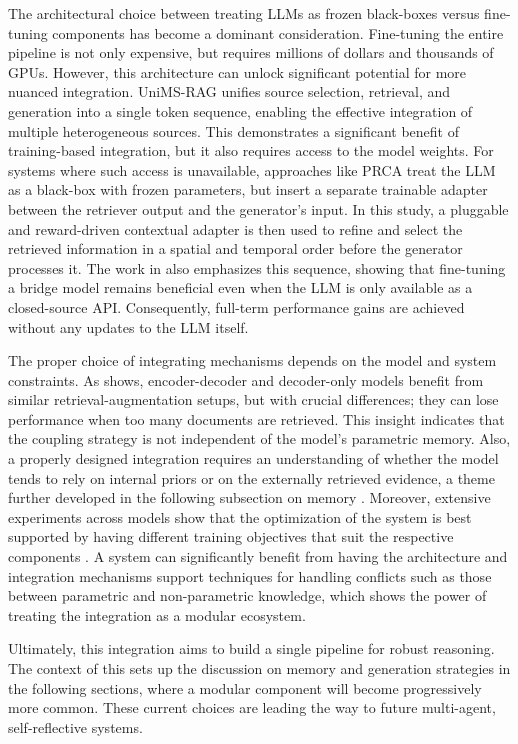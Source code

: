 \documentclass[11pt]{article}
\begin{document}
The architectural choice between treating LLMs as frozen black-boxes versus fine-tuning components has become a dominant consideration. Fine-tuning the entire pipeline is not only expensive, but requires millions of dollars and thousands of GPUs. However, this architecture can unlock significant potential for more nuanced integration. UniMS-RAG \cite{ref56} unifies source selection, retrieval, and generation into a single token sequence, enabling the effective integration of multiple heterogeneous sources. This demonstrates a significant benefit of training-based integration, but it also requires access to the model weights. For systems where such access is unavailable, approaches like PRCA \cite{ref57} treat the LLM as a black-box with frozen parameters, but insert a separate trainable adapter between the retriever output and the generator's input. In this study, a pluggable and reward-driven contextual adapter is then used to refine and select the retrieved information in a spatial and temporal order before the generator processes it. The work in \cite{ref55} also emphasizes this sequence, showing that fine-tuning a bridge model remains beneficial even when the LLM is only available as a closed-source API. Consequently, full-term performance gains are achieved without any updates to the LLM itself.

The proper choice of integrating mechanisms depends on the model and system constraints. As \cite{ref58} shows, encoder-decoder and decoder-only models benefit from similar retrieval-augmentation setups, but with crucial differences; they can lose performance when too many documents are retrieved. This insight indicates that the coupling strategy is not independent of the model's parametric memory. Also, a properly designed integration requires an understanding of whether the model tends to rely on internal priors or on the externally retrieved evidence, a theme further developed in the following subsection on memory \cite{ref37}. Moreover, extensive experiments across models show that the optimization of the system is best supported by having different training objectives that suit the respective components \cite{ref25}. A system can significantly benefit from having the architecture and integration mechanisms support techniques for handling conflicts such as those between parametric and non-parametric knowledge, which shows the power of treating the integration as a modular ecosystem.

Ultimately, this integration aims to build a single pipeline for robust reasoning. The context of this sets up the discussion on memory and generation strategies in the following sections, where a modular component will become progressively more common. These current choices are leading the way to future multi-agent, self-reflective systems.
\end{document}
